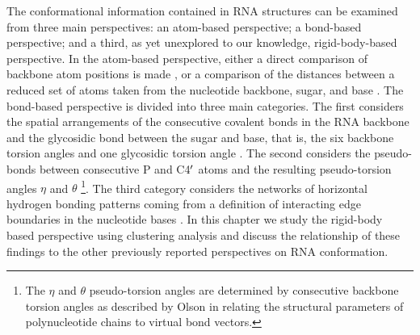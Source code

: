 \noindent The  conformational information contained  in RNA structures
can  be   examined  from   three  main  perspectives:   an  atom-based
perspective; a bond-based perspective;  and a third, as yet unexplored
to  our knowledge,  rigid-body-based perspective.   In  the atom-based
perspective, either a direct  comparison of backbone atom positions is
made \cite{reijmers2001},  or a comparison of the  distances between a
reduced set  of atoms taken  from the nucleotide backbone,  sugar, and
base  \cite{sykes2005}.  The  bond-based perspective  is  divided into
three main  categories.  The first considers  the spatial arrangements
of  the  consecutive  covalent  bonds  in the  RNA  backbone  and  the
glycosidic bond between the sugar  and base, that is, the six backbone
torsion  angles and one  glycosidic torsion  angle \cite{reijmers2001,
  murray2003,  hershkovitz2003, schneider2004,  hershkovitz2006}.  The
second   considers  the   pseudo-bonds  between   consecutive   P  and
C4$^{\rm{\prime}}$  atoms  and  the  resulting  pseudo-torsion  angles
$\eta$   and  $\theta$   \cite{olson1_1972,   duarte1998,  duarte2003,
  wadley2007} \footnote{The $\eta$  and $\theta$ pseudo-torsion angles
  are determined  by consecutive backbone torsion  angles as described
  by Olson  \cite{olson1980} in relating the  structural parameters of
  polynucleotide chains to virtual bond vectors.}.  The third category
considers the networks of  horizontal hydrogen bonding patterns coming
from  a definition of  interacting edge  boundaries in  the nucleotide
bases \cite{westhof2000,  leontis2002, leontis2006}.  In  this chapter
we study  the rigid-body  based perspective using  clustering analysis
and discuss the relationship of these findings to the other previously
reported perspectives on RNA conformation.

